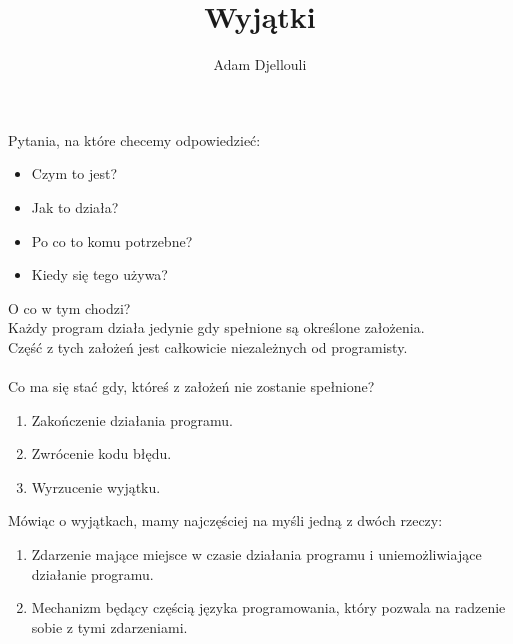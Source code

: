 \documentclass[notheorems, aspectratio=54]{beamer}
\title[Wyjątki]{Wyjątki}
\author{Adam Djellouli}
\begin{document}
\begin{frame}
    \titlepage
\end{frame}

\begin{frame}

Pytania, na które checemy odpowiedzieć:

\begin{itemize}
\item Czym to jest?
\item Jak to działa?
\item Po co to komu potrzebne?
\item Kiedy się tego używa?
\end{itemize}

\end{frame}

\begin{frame}
O co w tym chodzi?\\

Każdy program działa jedynie gdy spełnione są określone założenia.\\
Część z tych założeń jest całkowicie niezależnych od programisty.\\~\\
Co ma się stać gdy, któreś z założeń nie zostanie spełnione?\\

\begin{enumerate}
\item Zakończenie działania programu.
\item Zwrócenie kodu błędu.
\item Wyrzucenie wyjątku.
\end{enumerate}

\end{frame}

\begin{frame}

Mówiąc o wyjątkach, mamy najczęściej na myśli jedną z dwóch rzeczy:

\begin{enumerate}
\item Zdarzenie mające miejsce w czasie działania programu i uniemożliwiające działanie programu.
\item Mechanizm będący częścią języka programowania, który pozwala na radzenie sobie z tymi zdarzeniami.
\end{enumerate}

\end{frame}
\end{document}
